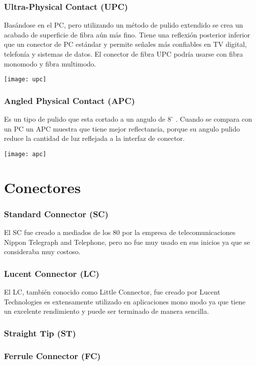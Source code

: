 \subsubsection*{Ultra-Physical Contact (UPC)}
Basándose en el PC, pero utilizando un método de pulido extendido se crea un acabado de superficie de fibra aún más fino. Tiene una reflexión posterior inferior que un conector de PC estándar y permite señales más confiables en TV digital, telefonía y sistemas de datos. El conector de fibra UPC podría usarse con fibra monomodo y fibra multimodo.
\begin{center}
\texttt{[image: upc]}
\end{center}
\subsubsection*{Angled Physical Contact (APC)}
Es un tipo de pulido que esta cortado a un angulo de $8^{\circ}$ . Cuando se compara con un PC un APC muestra que tiene mejor reflectancia, porque su angulo pulido reduce la cantidad de luz reflejada a la interfaz de conector.
\begin{center}
\texttt{[image: apc]}
\end{center}
\section{Conectores}
\subsubsection*{Standard Connector (SC)}
El SC fue creado a mediados de los 80 por la empresa de telecomunicaciones Nippon Telegraph and Telephone, pero no fue muy usado en sus inicios ya que se consideraba muy costoso.
\subsubsection*{Lucent Connector (LC)}
El LC, también conocido como Little Connector, fue creado por Lucent Technologies es extensamente utilizado en aplicaciones mono modo ya que tiene un excelente rendimiento y puede ser terminado de manera sencilla.
\subsubsection*{Straight Tip (ST)}
\subsubsection*{Ferrule Connector (FC)}
